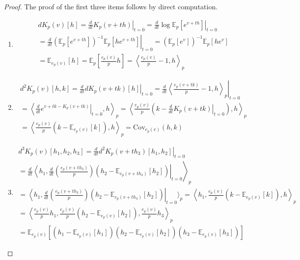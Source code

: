 \documentclass[axioms,article,submit,pdftex,moreauthors]{Definitions/mdpi}
\theoremstyle{plain}
\theoremstyle{remark}
\begin{document}
\begin{proof}
The proof of the first three items follows by direct computation. 
   \begin{enumerate}
    \item 
    \begin{multline*}
    dK_p(v)[h] = \left. \frac{d}{dt} K_p(v + th) \right|_{t=0} = \left. \frac{d}{dt} \log \mathbb{E}_p \left[ e^{v + th} \right] \right|_{t=0} \\
    = \left. \frac{d}{dt} \left( \mathbb{E}_p \left[ e^{v + th} \right] \right)^{-1} \mathbb{E}_p \left[ h e^{v + th} \right] \right|_{t=0} 
    = \left( \mathbb{E}_p \left[ e^v \right] \right)^{-1} \mathbb{E}_p \left[ h e^v \right]     \\
    = \mathbb{E}_{e_p(v)} [h] 
    = \mathbb{E}_p \left[ \frac{e_p(v)}{p} h \right] 
    = \left\langle \frac{e_p(v)}{p} - 1, h \right\rangle_p
\end{multline*}

    \item 
    
    \begin{multline*}
    d^2K_p(v)[h, k] = \left. \frac{d}{dt} dK_p(v + tk)[h] \right|_{t=0} 
    = \left. \frac{d}{dt} \left\langle \frac{e_p(v + tk)}{p} - 1, h \right\rangle_p \right|_{t=0} \\= \left\langle \left. \frac{d}{dt} e^{v + tk - K_p(v + tk)} \right|_{t=0}, h \right\rangle_p 
    = \left\langle \frac{e_p(v)}{p} \left( k - \left. \frac{d}{dt} K_p(v + tk) \right|_{t=0} \right), h \right\rangle_p \\
    = \left\langle \frac{e_p(v)}{p} \left( k - \mathbb{E}_{e_p(v)}[k] \right), h \right\rangle_p 
    = \text{Cov}_{e_p(v)}(h, k)
        \end{multline*}
  
    \item
   
    \begin{multline*}
    d^3K_p(v)[h_1, h_2, h_3] = \left. \frac{d}{dt} d^2K_p(v + th_3)[h_1, h_2] \right|_{t=0} \\
    = \left. \frac{d}{dt} \left\langle h_1, \frac{d}{dt} \left( \frac{e_p(v + th_3)}{p} \right) \left( h_2 -  \mathbb{E}_{e_p(v + th_3)}[h_2] \right) \right|_{t=0} \right\rangle_p \\
    = \left\langle h_1, \frac{d}{dt} \left( \frac{e_p(v + th_3)}{p} \right)  \left( h_2 - \mathbb{E}_{e_p(v + th_3)}[h_2] \right) \right|_{t=0} \rangle_p 
    = \left\langle h_1, \frac{e_p(v)}{p} \left( k - \mathbb{E}_{e_p(v)}[k] \right), h \right\rangle_p \\
    = \left\langle \frac{e_p(v)}{p} h_1, \frac{e_p(v)}{p} \left( h_2 - \mathbb{E}_{e_p(v)}[h_2] \right), \frac{e_p(v)}{p} h_3 \right\rangle_p \\
    = \mathbb{E}_{e_p(v)} \left[ \left( h_1 - \mathbb{E}_{e_p(v)}[h_1] \right) \left( h_2 - \mathbb{E}_{e_p(v)}[h_2] \right) \left( h_3 - \mathbb{E}_{e_p(v)}[h_3] \right) \right]
   \end{multline*} 


\end{enumerate}
\end{proof}
\end{document}
